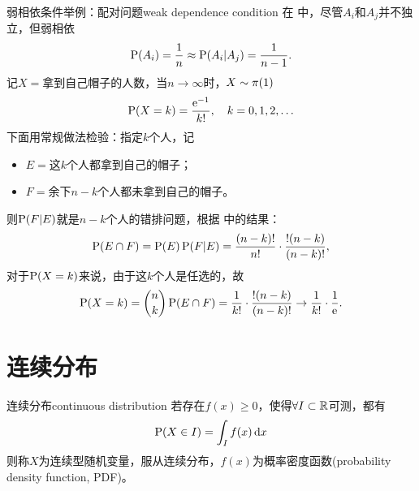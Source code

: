 \begin{example}{弱相依条件举例：配对问题}{weak dependence condition}
	在 中，尽管$A_i$和$A_j$并不独立，但弱相依
	\[
		\P(A_i)=\frac1n\approx\P(A_i|A_j)=\frac1{n-1}.
	\]
	记$X=$拿到自己帽子的人数，当$n\to\infty$时，$X\sim\Pois(1)$
	\[
		\P(X=k)=\frac{\e{-1}}{k!},\quad k=0,1,2,\ldots
	\]
	\tcblower
	下面用常规做法检验：指定$k$个人，记
	\begin{itemize}
		\item $E=$这$k$个人都拿到自己的帽子；
		\item $F=$余下$n-k$个人都未拿到自己的帽子。
	\end{itemize}
	则$\P(F|E)$就是$n-k$个人的错排问题，根据 中的结果：
	\[
		\P(E\cap F)=\P(E)\P(F|E)=\frac{(n-k)!}{n!}\cdot\frac{!(n-k)}{(n-k)!},
	\]
	对于$\P(X=k)$来说，由于这$k$个人是任选的，故
	\[
		\P(X=k)=\binom nk\P(E\cap F)=\frac1{k!}\cdot\frac{!(n-k)}{(n-k)!}\to\frac{1}{k!}\cdot\frac1{\e{}}.
	\]
\end{example}

\section{连续分布}

\begin{definition}{连续分布}{continuous distribution}
	若存在$f(x)\geqslant 0$，使得$\forall I\subset\RR$可测，都有
	\[
		\P(X\in I)=\int_If(x)\d x
	\]
	则称$X$为连续型随机变量，服从连续分布，$f(x)$为概率密度函数(probability density function, PDF)。
\end{definition}

